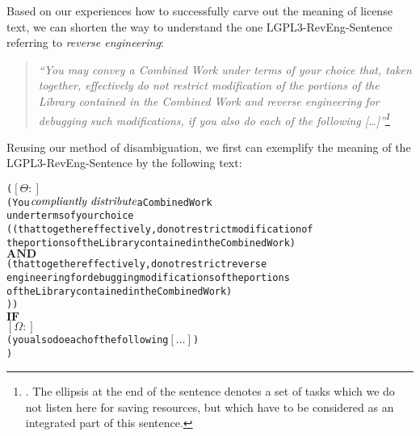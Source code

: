 %
%
%
%
%

Based on our experiences how to successfully carve out the meaning of license
text, we can shorten the way to understand the one LGPL3-RevEng-Sentence
referring to \emph{reverse engineering}:

\begin{quote}\emph{\enquote{You may convey a Combined Work under terms of your
choice that, taken together, effectively do not restrict modification of the
portions of the Library contained in the Combined Work and reverse engineering
for debugging such modifications, if you also do each of the following
[\ldots]}\footnote{\cite[cf.][\nopage wp., §4]{Lgpl30OsiLicense2007a}. The
ellipsis at the end of the sentence denotes a set of tasks which we do not
listen here for saving resources, but which have to be considered as an
integrated part of this sentence.}}
\end{quote}

Reusing our method of disambiguation, we first can exemplify the meaning of the
LGPL3-RevEng-Sentence by the following text:

\begin{alltt}   
( \([\Theta:]\)
  ( You \(\emph{compliantly distribute}\) a Combined Work 
    under terms of your choice 
    (   (that together effectively, do not restrict modification of 
        the portions of the Library contained in the Combined Work)
    \(\textbf{AND}\) 
        (that together effectively, do not restrict reverse
        engineering for debugging modifications of the portions
        of the Library contained in the Combined Work)
  )  )
  \(\textbf{IF}\)
  \([\Omega:]\) 
  ( you also do each of the following \([\ldots]\))
)
\end{alltt}

